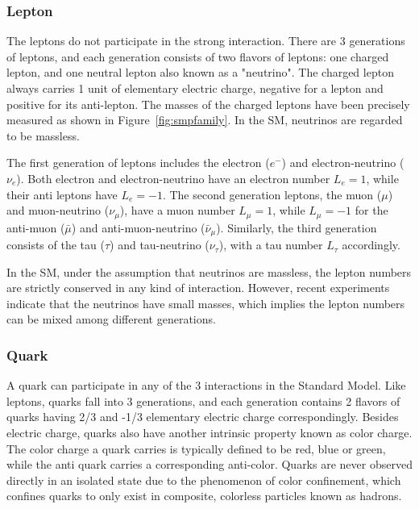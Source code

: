 \subsubsection{Lepton}
The leptons do not participate in the strong interaction. There are 3 generations of leptons, and each generation consists of two flavors of leptons: one charged lepton, and one neutral lepton also known as a "neutrino". The charged lepton always carries 1 unit of elementary electric charge, negative for a lepton and positive for its anti-lepton. The masses of the charged leptons have been precisely measured as shown in Figure~\ref{fig:smpfamily}. In the SM, neutrinos are regarded to be massless.

\vspace{0.3cm}
The first generation of leptons includes the electron ($e^{-}$) and electron-neutrino ($\nu _{e}$). Both electron and electron-neutrino have an electron number $L_{e}=1$, while their anti leptons have $L_{e}=-1$. The second generation leptons, the muon ($\mu$) and muon-neutrino ($\nu_{\mu}$), have a muon number $L_{\mu}=1$, while $L_{\mu }=-1$ for the anti-muon ($\bar{\mu}$) and anti-muon-neutrino ($\bar{\nu} _{\mu }$). Similarly, the third generation consists of the tau ($\tau$) and tau-neutrino ($\nu _{\tau }$), with a tau number $L_{\tau}$ accordingly.

\vspace{0.3cm}
In the SM, under the assumption that neutrinos are massless, the lepton numbers are strictly conserved in any kind of interaction. However, recent experiments~\cite{neutrinoOscillation1,neutrinoOscillation2} indicate that the neutrinos have small masses, which implies the lepton numbers can be mixed among different generations.
\subsubsection{Quark}
A quark can participate in any of the 3 interactions in the Standard Model. Like leptons, quarks fall into 3 generations, and each generation contains 2 flavors of quarks having 2/3 and -1/3 elementary electric charge correspondingly. Besides electric charge, quarks also have another intrinsic property known as color charge. The color charge a quark carries is typically defined to be red, blue or green, while the anti quark carries a corresponding anti-color. Quarks are never observed directly in an isolated state due to the phenomenon of color confinement, which confines quarks to only exist in composite, colorless particles known as hadrons.

